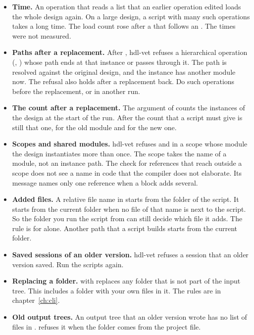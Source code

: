 \begin{itemize}
\begin{itemize}
    kinds that exist. A kind that is spelled wrong is a text, so it is accepted. For
     the sign-off reports that it did not see the change. For
     nothing reports it.
  \item {} raises , not , for a file
    that is not there or cannot be read.
  \end{itemize}
\item \textbf{Time.} An operation that reads a list that an earlier operation edited
  loads the whole design again. On a large design, a script with many such operations takes
  a long time. The load count rose after a  that follows an
  . The times were not measured.
\item \textbf{Paths after a replacement.} After , hdl-vet
  refuses a hierarchical operation (, )
  whose path ends at that instance or passes through it. The path is resolved against the
  original design, and the instance has another module now. The refusal also holds after a
  replacement back. Do such operations before the replacement, or in another run.
\item \textbf{The count after a replacement.} The argument  of
   counts the instances of the design at the start of the run. After
   the count that a script must give is still that one,
  for the old module and for the new one.
\item \textbf{Scopes and shared modules.} hdl-vet refuses  and
   in a scope whose module the design instantiates more than
  once. The scope takes the name of a module, not an instance path. The check for
  references that reach outside a scope does not see a name in code that the compiler does
  not elaborate. Its message names only one reference when a block adds several.
\item \textbf{Added files.} A relative file name in  starts from the
  folder of the script. It starts from the current folder when no file of that name is next
  to the script. So the folder you run the script from can still decide which file it adds.
  The rule is for  alone. Another path that a script builds starts
  from the current folder.
\item \textbf{Saved sessions of an older version.} hdl-vet refuses a session that an
  older version saved. Run the scripts again.
\item \textbf{Replacing a folder.}  with  replaces any folder that is
  not part of the input tree. This includes a folder with your own files in it. The rules
  are in chapter~\ref{ch:cli}.
\item \textbf{Old output trees.} An output tree that an older version wrote has no list
  of files in .  refuses it when the folder comes from the
  project file.
\end{itemize}
